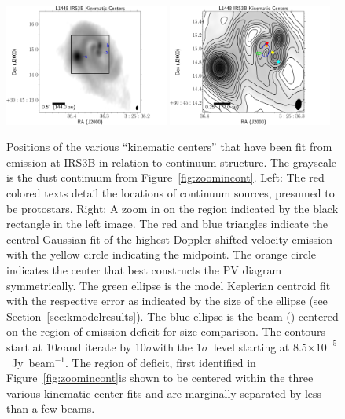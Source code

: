 \begin{figure}[H]
\begin{center}
   \includegraphics[width=0.48\textwidth]{img/L1448IRS3B_cont_robust05kincenters.pdf} %
   \includegraphics[width=0.48\textwidth]{img/L1448IRS3B_cont_robust05kincenters_zoom.pdf} %
\end{center}
   \caption{Positions of the various ``kinematic centers'' that have been fit from \cso\space emission at IRS3B in relation to continuum structure. The grayscale is the dust continuum from Figure~\ref{fig:zoomincont}. Left: The red colored texts detail the locations of continuum sources, presumed to be protostars. Right: A zoom in on the region indicated by the black rectangle in the left image. The red and blue triangles indicate the central Gaussian fit of the highest Doppler-shifted velocity emission with the yellow circle indicating the midpoint. The orange circle indicates the center that best constructs the PV diagram symmetrically. The green ellipse is the model Keplerian centroid fit with the respective error as indicated by the size of the ellipse (see Section~\ref{sec:kmodelresults}). The blue ellipse is the \cso\space beam (\csobeam) centered on the region of emission deficit for size comparison. The contours start at 10$\sigma$\space and iterate by 10$\sigma$\space with the 1$\sigma$~level starting at 8.5$\times10^{-5}$~Jy~beam$^{-1}$. The region of deficit, first identified in Figure~\ref{fig:zoomincont}\space is shown to be centered within the three various kinematic center fits and are marginally separated by less than a few beams.}\label{fig:kincenter}
\end{figure}




